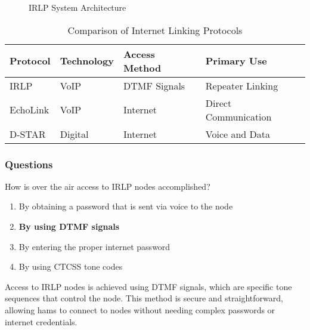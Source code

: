 \begin{figure}[h]
    \centering
    \caption{IRLP System Architecture}
    \label{fig:irlp-architecture}
\end{figure}

\begin{table}[h]
    \centering
    \caption{Comparison of Internet Linking Protocols}
    \label{tab:irlp-comparison}
    \begin{tabular}{|l|l|l|l|}
        \hline
        \textbf{Protocol} & \textbf{Technology} & \textbf{Access Method} & \textbf{Primary Use} \\
        \hline
        IRLP & VoIP & DTMF Signals & Repeater Linking \\
        EchoLink & VoIP & Internet & Direct Communication \\
        D-STAR & Digital & Internet & Voice and Data \\
        \hline
    \end{tabular}
\end{table}

\subsubsection*{Questions}

\begin{tcolorbox}[colback=gray!10!white,colframe=black!75!black,title={T8C06}]
    How is over the air access to IRLP nodes accomplished?
    \begin{enumerate}[label=\Alph*),noitemsep]
        \item By obtaining a password that is sent via voice to the node
        \item \textbf{By using DTMF signals}
        \item By entering the proper internet password
        \item By using CTCSS tone codes
    \end{enumerate}
\end{tcolorbox}
Access to IRLP nodes is achieved using DTMF signals, which are specific tone sequences that control the node. This method is secure and straightforward, allowing hams to connect to nodes without needing complex passwords or internet credentials.

